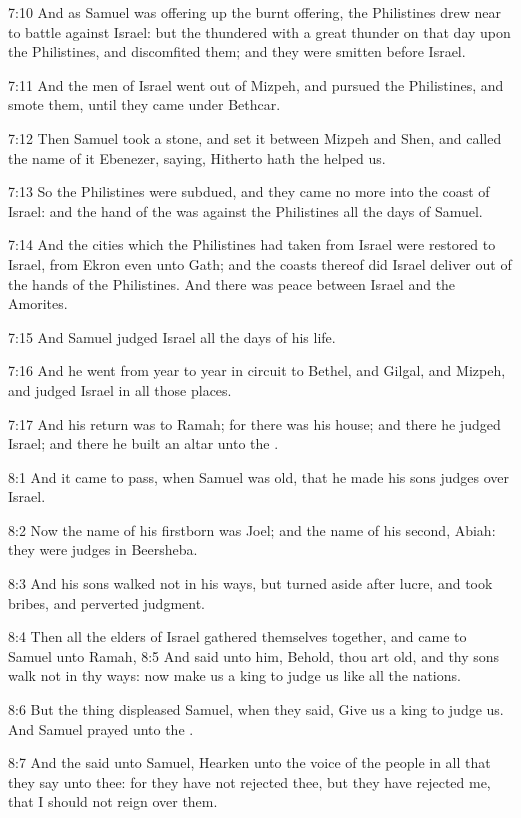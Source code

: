 7:10 And as Samuel was offering up the burnt offering, the Philistines drew near to battle against Israel: but the \LORD thundered with a great thunder on that day upon the Philistines, and discomfited them; and they were smitten before Israel.

7:11 And the men of Israel went out of Mizpeh, and pursued the Philistines, and smote them, until they came under Bethcar.

7:12 Then Samuel took a stone, and set it between Mizpeh and Shen, and called the name of it Ebenezer, saying, Hitherto hath the \LORD helped us.

7:13 So the Philistines were subdued, and they came no more into the coast of Israel: and the hand of the \LORD was against the Philistines all the days of Samuel.

7:14 And the cities which the Philistines had taken from Israel were restored to Israel, from Ekron even unto Gath; and the coasts thereof did Israel deliver out of the hands of the Philistines. And there was peace between Israel and the Amorites.

7:15 And Samuel judged Israel all the days of his life.

7:16 And he went from year to year in circuit to Bethel, and Gilgal, and Mizpeh, and judged Israel in all those places.

7:17 And his return was to Ramah; for there was his house; and there he judged Israel; and there he built an altar unto the \LORD.

8:1 And it came to pass, when Samuel was old, that he made his sons judges over Israel.

8:2 Now the name of his firstborn was Joel; and the name of his second, Abiah: they were judges in Beersheba.

8:3 And his sons walked not in his ways, but turned aside after lucre, and took bribes, and perverted judgment.

8:4 Then all the elders of Israel gathered themselves together, and came to Samuel unto Ramah, 8:5 And said unto him, Behold, thou art old, and thy sons walk not in thy ways: now make us a king to judge us like all the nations.

8:6 But the thing displeased Samuel, when they said, Give us a king to judge us. And Samuel prayed unto the \LORD.

8:7 And the \LORD said unto Samuel, Hearken unto the voice of the people in all that they say unto thee: for they have not rejected thee, but they have rejected me, that I should not reign over them.

